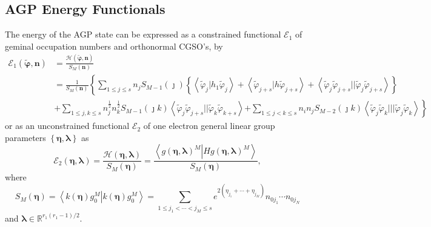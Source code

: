 \documentclass[aps,preprint]{revtex4}%
\begin{document}
\subsection{AGP Energy Functionals}

The energy of the AGP state can be expressed as a constrained functional
$\mathcal{E}_{1}$ of geminal occupation numbers and orthonormal CGSO's, by
\emph{ }
\begin{align}
\mathcal{E}_{1}\left(  \mathbf{\tilde{\varphi},n}\right)   &  =\frac
{\mathcal{H}\left(  \mathbf{\tilde{\varphi},n}\right)  }{S_{M}\left(
\mathbf{n}\right)  }\nonumber\\
&  =\frac{1}{S_{M}\left(  \mathbf{n}\right)  }\left\{  \sum_{1\leq j\leq
s}n_{j}S_{M-1}\left(  \jmath\right)  \left\{  \left\langle \tilde{\varphi}%
_{j}\left\vert h_{1}\right.  \tilde{\varphi}_{j}\right\rangle +\left\langle
\tilde{\varphi}_{j+s}\left\vert h\right.  \tilde{\varphi}_{j+s}\right\rangle
+\left\langle \tilde{\varphi}_{j}\tilde{\varphi}_{j+s}||\tilde{\varphi}%
_{j}\tilde{\varphi}_{j+s}\right\rangle \right\}  \right. \nonumber\\
&  +\sum_{1\leq j,k\leq s}n_{j}^{\frac{1}{2}}n_{k}^{\frac{1}{2}}S_{M-1}\left(
\jmath k\right)  \left\langle \tilde{\varphi}_{j}\tilde{\varphi}_{j+s}%
||\tilde{\varphi}_{k}\tilde{\varphi}_{k+s}\right\rangle \left.  +\sum_{1\leq
j<k\leq s}n_{i}n_{j}S_{M-2}\left(  \jmath k\right)  \left\langle
\tilde{\varphi}_{j}\tilde{\varphi}_{k}|||\tilde{\varphi}_{j}\tilde{\varphi
}_{k}\right\rangle \right\}  \label{energy}%
\end{align}
or as an unconstrained functional $\mathcal{E}_{2}$ of one electron general
linear group parameters $\left\{  \mathbf{\eta},\mathbf{\lambda}\right\}  $
as
\begin{equation}
\mathcal{E}_{2}\left(  \mathbf{\eta},\mathbf{\lambda}\right)  =\frac
{\mathcal{H}\left(  \mathbf{\eta},\mathbf{\lambda}\right)  }{S_{M}\left(
\mathbf{\eta}\right)  }=\frac{\left\langle \left.  g\left(  \mathbf{\eta
},\mathbf{\lambda}\right)  ^{M}\right\vert Hg\left(  \mathbf{\eta
},\mathbf{\lambda}\right)  ^{M}\right\rangle }{S_{M}\left(  \mathbf{\eta
}\right)  }, \label{gp_funct}%
\end{equation}
where%
\begin{equation}
S_{M}\left(  \mathbf{\eta}\right)  =\left\langle \left.  k\left(
\mathbf{\eta}\right)  g_{0}^{M}\right\vert k\left(  \mathbf{\eta}\right)
g_{0}^{M}\right\rangle =\sum_{1\leq j_{1}<\cdots<j_{M}\leq s}e^{2\left(
\eta_{j_{1}}+\cdots+\eta_{j_{M}}\right)  }n_{0j_{1}}\cdots n_{0j_{N}}%
\end{equation}
and $\mathbf{\lambda\in}\mathbb{R}^{r_{1}\left(  r_{1}-1\right)  /2}.$
\end{document}
